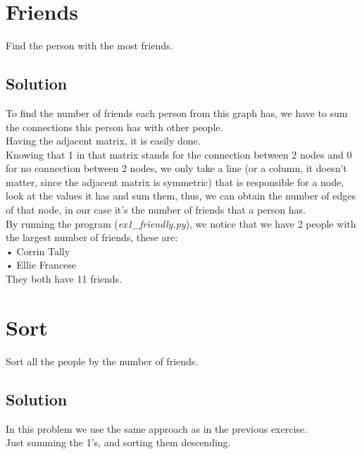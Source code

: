 \documentclass{article}
\begin{document}
  \section{Friends}
    \centerline{Find the person with the most friends.}

  \vspace{2em}

  \subsection{Solution}
    To find the number of friends each person from this graph has, we have to sum
    the connections this person has with other people.\\ Having the adjacent matrix, it is easily done.\\
    Knowing that 1 in that matrix stands for the connection between 2 nodes and
    0 for no connection between 2 nodes, we only take a line (or a column,
    it doesn't matter, since the adjacent matrix is symmetric) that is responsible
    for a node, look at the values it has and sum them, thus, we can obtain the number
    of edges of that node, in our case it's the number of friends that a person has.\\
    By running the program (\emph{ex1\_friendly.py}), we notice that we have 2 people with
    the largest number of friends, these are:\\
    • Corrin Tally\\
    • Ellie Francese\\
    They both have 11 friends.


  \newpage


  \section{Sort}
    \centerline{Sort all the people by the number of friends.}

  \vspace{3em}

  \subsection{Solution}

    In this problem we use the same approach as in the previous exercise.\\
    Just summing the 1's, and sorting them descending.
\end{document}
